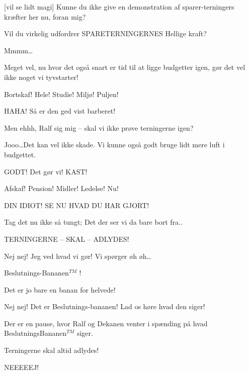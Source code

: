 \documentclass[a4paper,12pt]{article}
\begin{document}
\begin{sketch}
[vil se lidt magi] Kunne du ikke give en demonstration af sparer-terningers kræfter her nu, foran mig?

 Vil du virkelig udfordrer SPARETERNINGERNES Hellige kraft?

 Mmmm\ldots {}

 Meget vel, nu hvor det også snart er tid til at ligge budgetter igen, gør det vel ikke noget vi tyvstarter!


 Bortskaf! Hele! Studie! Miljø! Puljen!


 HAHA! Så er den ged vist barberet! 

 Men ehhh, Ralf sig mig -- skal vi ikke prøve terningerne igen?


Jooo\ldots Det kan vel ikke skade. Vi kunne også godt bruge lidt mere luft i budgettet.

 GODT! Det gør vi! KAST!


 Afskaf! Pension! Midler! Ledelse! Nu! 

 DIN IDIOT! SE NU HVAD DU HAR GJORT!

 Tag det nu ikke så tungt; Det der ser vi da bare bort fra..

 TERNINGERNE -- SKAL -- ADLYDES!


 Nej nej! Jeg ved hvad vi gør! Vi spørger øh øh\ldots


 Beslutnings-Bananen$^{TM}$ !


 Det er jo bare en banan for helvede!

 Nej nej! Det er Beslutnings-bananen! Lad os høre hvad den siger!

\scene Der er en pause, hvor Ralf og Dekanen venter i spænding på hvad BeslutningsBananen$^{TM}$ siger.

 Terningerne skal altid adlydes!

 NEEEEEJ!
\end{sketch}
\end{document}
